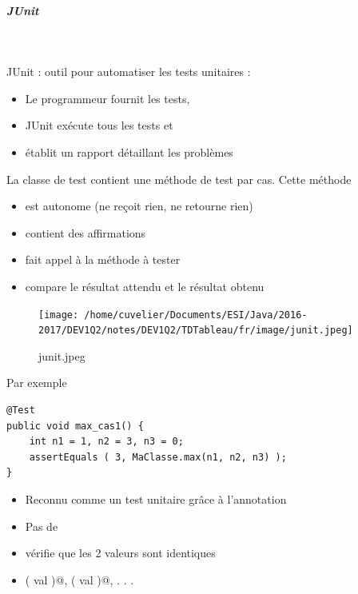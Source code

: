 \documentclass[11pt,a4paper]{article}
\begin{document}
            \par
        
			
		\subparagraph{JUnit} 
		
					\textcolor{white}{.} \par
				
          JUnit : outil pour automatiser les tests unitaires :
          
					\begin{itemize}
				
			\item Le programmeur fournit les tests,
			\item JUnit ex\'ecute tous les tests et
			\item \'etablit un rapport d\'etaillant les probl\`emes
					\end{itemize}
				
            \par
        
          La classe de test contient une m\'ethode de test par cas. Cette m\'ethode
          
					\begin{itemize}
				
			\item est autonome (ne re\c coit rien, ne retourne rien)
			\item contient des affirmations
			\item fait appel \`a la m\'ethode \`a tester
			\item compare le r\'esultat attendu et le r\'esultat obtenu
					\end{itemize}
				
            \par
        \begin{figure}[hbt]
				    \begin{center}
					\texttt{[image: /home/cuvelier/Documents/ESI/Java/2016-2017/DEV1Q2/notes/DEV1Q2/TDTableau/fr/image/junit.jpeg]}
						\end{center}
                
                    \caption[junit.jpeg]{junit.jpeg}
                \end{figure}
                    
            \par
        Par exemple
            \par
        \begin{verbatim}
@Test
public void max_cas1() {
    int n1 = 1, n2 = 3, n3 = 0;
    assertEquals ( 3, MaClasse.max(n1, n2, n3) );
}
\end{verbatim}
					\begin{itemize}
				
			\item Reconnu comme un test unitaire gr\^ace \`a l'annotation \verb@@Test@
			\item Pas de \verb@static@
			\item \verb@assertEquals@ v\'erifie que les 2 valeurs sont identiques
			\item \verb@assertTrue ( val )@, \verb@assertFalse ( val )@, . . .
					\end{itemize}
				
\end{document}
